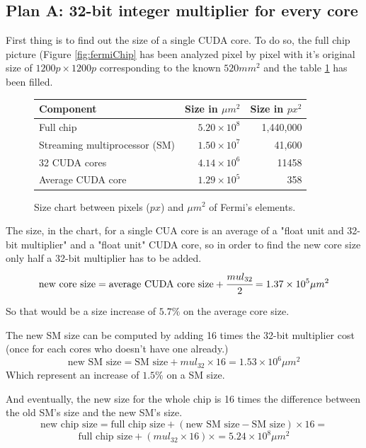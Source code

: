 \documentclass{report}
\begin{document}
   \subsection{Plan A: 32-bit integer multiplier for every core}
   First thing is to find out the size of a single CUDA core. To do so, the full chip picture (Figure \ref{fig:fermiChip} has been analyzed pixel by pixel with it's original size of $1200p \times 1200p$ corresponding to
   the known $520mm^2$ and the table \ref{tab:sizeChart} has been filled.
   \begin{figure}[H]
    \centering
        \begin{tabular}{ | l | r | r | }
    	    \hline
    	    Component & Size in $\mu m^2$ & Size in $px^2$ \\ \hline
    	    Full chip &  $5.20 \times 10^8$ & 1,440,000 \\
            Streaming multiprocessor (SM) & $1.50 \times 10^7$ & 41,600 \\
            32 CUDA cores & $4.14 \times 10^6$ & 11458 \\
            Average CUDA core & $1.29 \times 10^5$ &  358 \\ \hline
  	    \end{tabular}
  	\captionsetup{justification=centering}
  	\caption{Size chart between pixels ($px$) and $\mu m^2$ of Fermi's elements.}
  	\label{tab:sizeChart}
    \end{figure}
    
    The size, in the chart, for a single CUA core is an average of a "float unit and 32-bit multiplier"
    and a "float unit" CUDA core, so in order to find the new core size only half a 32-bit multiplier has to be added.
    \[\text{new core size} = \text{average CUDA core size} + \cfrac{mul_{32}}{2} = 1.37 \times 10^5 \mu m^2 \] 
    
    So that would be a size increase of $5.7\%$ on the average core size.
    
    The new SM size can be computed by adding 16 times the 32-bit multiplier cost (once for each cores who doesn't have one already.)
    \[\text{new SM size} = \text{SM size} + mul_{32} \times 16 = 1.53 \times 10^6 \mu m^2 \]
    Which represent an increase of $1.5\%$ on a SM size.
    
    And eventually, the new size for the whole chip is 16 times the difference between the old SM's size and the new SM's size.
    \[\text{new chip size} = \text{full chip size} + (\text{new SM size} - \text{SM size}) \times 16 =\]
    \[\text{full chip size} + (mul_{32} \times 16) \times  = 5.24 \times 10^8 \mu m^2 \]
   
\end{document}
